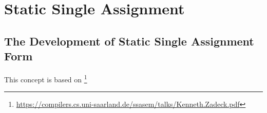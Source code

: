 \section{Static Single Assignment}

\subsection{The Development of Static Single Assignment Form}

This concept is based on \footnote{\url{https://compilers.cs.uni-saarland.de/ssasem/talks/Kenneth.Zadeck.pdf}}
